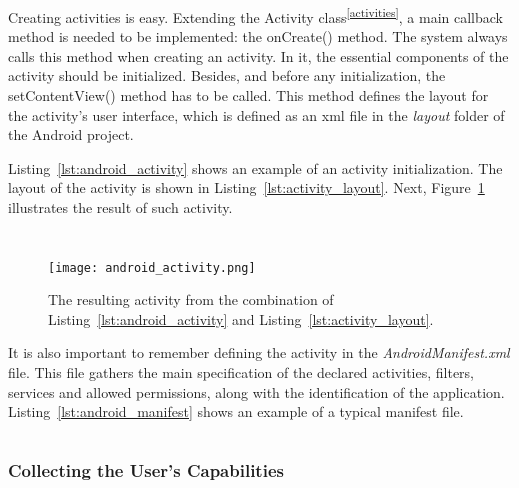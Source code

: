 Creating activities is easy. Extending the Activity class\textsuperscript{\ref{activities}},
a main callback method is needed to be implemented: the onCreate() method. The
system always calls this method when creating an activity. In it, the essential
components of the activity should be initialized. Besides, and before any
initialization, the setContentView() method has to be called. This method defines
the layout for the activity's user interface, which is defined as an \ac{xml}
file in the \textit{layout} folder of the Android project.

Listing~\ref{lst:android_activity} shows an example of an activity initialization.
The layout of the activity is shown in Listing~\ref{lst:activity_layout}. Next,
Figure~\ref{fig:android_activity} illustrates the result of such activity.

\inputminted[linenos=true, fontsize=\footnotesize, frame=lines]{java}{4_system_architecture/android_activity.java}

\inputminted[linenos=true, fontsize=\footnotesize, frame=lines]{xml}{4_system_architecture/activity_layout.xml}

\begin{figure}
\centering
\texttt{[image: android\_activity.png]}
\caption{The resulting activity from the combination of Listing~\ref{lst:android_activity} and
Listing~\ref{lst:activity_layout}.}
\label{fig:android_activity}
\end{figure}

It is also important to remember defining the activity in the \textit{AndroidManifest.xml}
file. This file gathers the main specification of the declared activities, filters,
services and allowed permissions, along with the identification of the application.
Listing~\ref{lst:android_manifest} shows an example of a typical manifest file.

\inputminted[linenos=true, fontsize=\footnotesize, frame=lines]{xml}{4_system_architecture/android_manifest.xml}

\subsubsection{Collecting the User's Capabilities}
\label{sec:user_capabilities}

